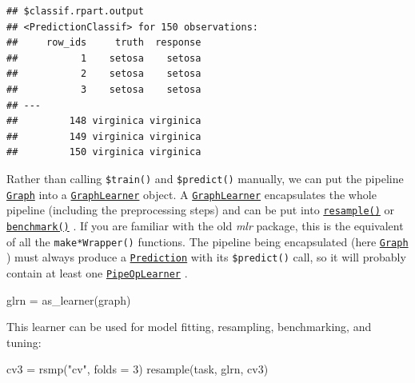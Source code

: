 \documentclass[
]{scrbook}
\newenvironment{Shaded}{\begin{snugshade}}{\end{snugshade}}
\newcommand{\AttributeTok}[1]{\textcolor[rgb]{0.77,0.63,0.00}{#1}}
\newcommand{\DecValTok}[1]{\textcolor[rgb]{0.00,0.00,0.81}{#1}}
\newcommand{\FunctionTok}[1]{\textcolor[rgb]{0.00,0.00,0.00}{#1}}
\newcommand{\NormalTok}[1]{#1}
\newcommand{\OtherTok}[1]{\textcolor[rgb]{0.56,0.35,0.01}{#1}}
\newcommand{\StringTok}[1]{\textcolor[rgb]{0.31,0.60,0.02}{#1}}
\renewenvironment{Shaded} {\begin{snugshade}\small} {\end{snugshade}}
\begin{document}
\begin{verbatim}
## $classif.rpart.output
## <PredictionClassif> for 150 observations:
##     row_ids     truth  response
##           1    setosa    setosa
##           2    setosa    setosa
##           3    setosa    setosa
## ---                            
##         148 virginica virginica
##         149 virginica virginica
##         150 virginica virginica
\end{verbatim}

Rather than calling \texttt{\$train()} and \texttt{\$predict()} manually, we can put the pipeline \href{https://mlr3pipelines.mlr-org.com/reference/Graph.html}{\texttt{Graph}} into a \href{https://mlr3pipelines.mlr-org.com/reference/mlr_learners_graph.html}{\texttt{GraphLearner}} object.
A \href{https://mlr3pipelines.mlr-org.com/reference/mlr_learners_graph.html}{\texttt{GraphLearner}} encapsulates the whole pipeline (including the preprocessing steps) and can be put into \href{https://mlr3.mlr-org.com/reference/resample.html}{\texttt{resample()}} or \href{https://mlr3.mlr-org.com/reference/benchmark.html}{\texttt{benchmark()}} .
If you are familiar with the old \emph{mlr} package, this is the equivalent of all the \texttt{make*Wrapper()} functions.
The pipeline being encapsulated (here \href{https://mlr3pipelines.mlr-org.com/reference/Graph.html}{\texttt{Graph}} ) must always produce a \href{https://mlr3.mlr-org.com/reference/Prediction.html}{\texttt{Prediction}} with its \texttt{\$predict()} call, so it will probably contain at least one \href{https://mlr3pipelines.mlr-org.com/reference/mlr_pipeops_learner.html}{\texttt{PipeOpLearner}} .

\begin{Shaded}
\begin{Highlighting}[]
\NormalTok{glrn }\OtherTok{=} \FunctionTok{as\_learner}\NormalTok{(graph)}
\end{Highlighting}
\end{Shaded}

This learner can be used for model fitting, resampling, benchmarking, and tuning:

\begin{Shaded}
\begin{Highlighting}[]
\NormalTok{cv3 }\OtherTok{=} \FunctionTok{rsmp}\NormalTok{(}\StringTok{"cv"}\NormalTok{, }\AttributeTok{folds =} \DecValTok{3}\NormalTok{)}
\FunctionTok{resample}\NormalTok{(task, glrn, cv3)}
\end{Highlighting}
\end{Shaded}
\end{document}
